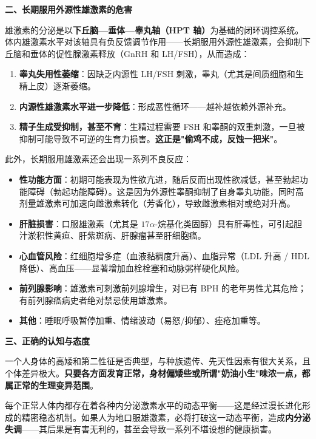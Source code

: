 \documentclass[12pt,a4paper,twoside]{ctexbook}
\begin{document}
\vspace{0.5em}
\noindent\textbf{二、长期服用外源性雄激素的危害}

雄激素的分泌是以\textbf{下丘脑—垂体—睾丸轴（HPT 轴）}为基础的闭环调控系统。体内雄激素水平对该轴具有负反馈调节作用——长期服用外源性雄激素，会抑制下丘脑和垂体的促性腺激素释放（GnRH 和 LH/FSH），从而造成：

\begin{enumerate}
	\item \textbf{睾丸失用性萎缩}：因缺乏内源性 LH/FSH 刺激，睾丸（尤其是间质细胞和生精上皮）逐渐萎缩。
	\item \textbf{内源性雄激素水平进一步降低}：形成恶性循环——越补越依赖外源补充。
	\item \textbf{精子生成受抑制，甚至不育}：生精过程需要 FSH 和睾酮的双重刺激，一旦被抑制可能导致不可逆的生育力损害。\textbf{这正是"偷鸡不成，反蚀一把米"}。
\end{enumerate}

此外，长期服用雄激素还会出现一系列不良反应：
\begin{itemize}
	\item \textbf{性功能方面}：初期可能表现为性欲亢进，随后反而出现性欲减低，甚至勃起功能障碍（勃起功能障碍）。这是因为外源性睾酮抑制了自身睾丸功能，同时高剂量雄激素可加速向雌激素转化（芳香化），导致雌激素相对或绝对升高。
	\item \textbf{肝脏损害}：口服雄激素（尤其是 $17\alpha$-烷基化类固醇）具有肝毒性，可引起胆汁淤积性黄疸、肝紫斑病、肝腺瘤甚至肝细胞癌。
	\item \textbf{心血管风险}：红细胞增多症（血液黏稠度升高）、血脂异常（LDL 升高 / HDL 降低）、高血压——显著增加血栓栓塞和动脉粥样硬化风险。
	\item \textbf{前列腺影响}：雄激素可刺激前列腺增生，对已有 BPH 的老年男性尤其危险；有前列腺癌病史者绝对禁忌使用雄激素。
	\item \textbf{其他}：睡眠呼吸暂停加重、情绪波动（易怒/抑郁）、痤疮加重等。
\end{itemize}

\vspace{0.5em}
\noindent\textbf{三、正确的认知与态度}

一个人身体的高矮和第二性征是否典型，与种族遗传、先天性因素有很大关系，且个体差异极大。\textbf{只要各方面发育正常，身材偏矮些或所谓"奶油小生"味浓一点，都属正常的生理变异范围}。

每个正常人体内都存在着各种内分泌激素水平的动态平衡——这是经过漫长进化形成的精密稳态机制。如果人为地口服雄激素，必将打破这一动态平衡，造成\textbf{内分泌失调}——其后果是有害无利的，甚至会导致一系列不堪设想的健康损害。
\end{document}
